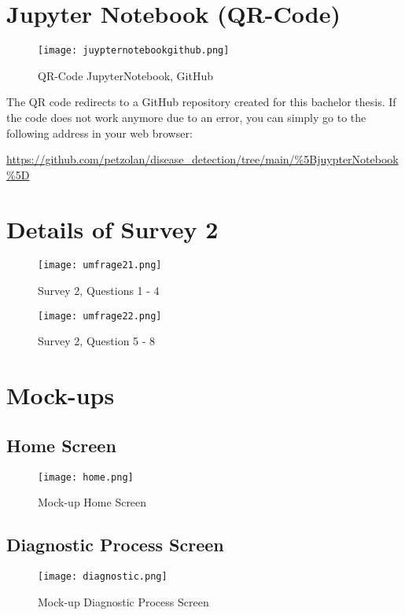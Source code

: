 \pagebreak
\tocless\chapter{Jupyter Notebook (QR-Code)}
\begin{figure}[H]
	\centering
	\texttt{[image: juypternotebookgithub.png]}
	\caption{QR-Code JupyterNotebook, GitHub}
\end{figure}
The QR code redirects to a GitHub repository created for this bachelor thesis. If the code does not work anymore due to an error, you can simply go to the following address in your web browser:
\begin{center}
	\url{https://github.com/petzolan/disease_detection/tree/main/%5BjuypterNotebook%5D}
\end{center}



\tocless\chapter{Details of Survey 2}
\begin{center}
	\begin{figure}[H]
		\centering
		\texttt{[image: umfrage21.png]}
		\caption{Survey 2, Questions 1 - 4}
	\end{figure}
	\begin{figure}[H]
		\centering
		\texttt{[image: umfrage22.png]}
		\caption{Survey 2, Question 5 - 8}
	\end{figure}
\end{center}
\pagebreak


\tocless\chapter{Mock-ups}
\tocless\section{Home Screen}
\begin{figure}[H]
	\centering
	\texttt{[image: home.png]}
	\caption{Mock-up Home Screen}
\end{figure}

\tocless\section{Diagnostic Process Screen}
\begin{figure}[H]
	\centering
	\texttt{[image: diagnostic.png]}
	\caption{Mock-up Diagnostic Process Screen}
\end{figure}

